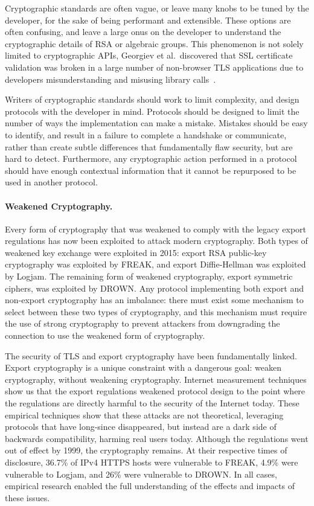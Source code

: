 Cryptographic standards are often vague, or leave many knobs to be tuned by
the developer, for the sake of being performant and extensible. These options
are often confusing, and leave a large onus on the developer to understand
the cryptographic details of RSA or algebraic groups. This phenomenon is not
solely limited to cryptographic APIs, Georgiev et al.\ discovered that SSL
certificate validation was broken in a large number of non-browser TLS
applications due to developers misunderstanding and misusing library
calls~\cite{most-dangerous-code-2012}.

Writers of cryptographic standards should work to limit complexity, and
design protocols with the developer in mind. Protocols should be designed to
limit the number of ways the implementation can make a mistake. Mistakes
should be easy to identify, and result in a failure to complete a handshake
or communicate, rather than create subtle differences that fundamentally flaw
security, but are hard to detect. Furthermore, any cryptographic action
performed in a protocol should have enough contextual information that it
cannot be repurposed to be used in another protocol.

\paragraph{Weakened Cryptography.}
Every form of cryptography that was weakened to comply with the legacy export
regulations has now been exploited to attack modern cryptography. Both types
of weakened key exchange were exploited in 2015: export RSA public-key
cryptography was exploited by FREAK, and export Diffie-Hellman was exploited
by Logjam. The remaining form of weakened cryptography, export symmetric
ciphers, was exploited by DROWN. Any protocol implementing both export and
non-export cryptography has an imbalance: there must exist some mechanism to
select between these two types of cryptography, and this mechanism must
require the use of strong cryptography to prevent attackers from downgrading
the connection to use the weakened form of cryptography.

The security of TLS and export cryptography have been fundamentally linked.
Export cryptography is a unique constraint with a dangerous goal: weaken
cryptography, without weakening cryptography. Internet measurement techniques
show us that the export regulations weakened protocol design to the point
where the regulations are directly harmful to the security of the Internet
today. These empirical techniques show that these attacks are not
theoretical, leveraging protocols that have long-since disappeared, but
instead are a dark side of backwards compatibility, harming real users today.
Although the regulations went out of effect by 1999, the cryptography
remains. At their respective times of disclosure, 36.7\% of IPv4 HTTPS hosts
were vulnerable to FREAK, 4.9\% were vulnerable to Logjam, and 26\% were
vulnerable to DROWN. In all cases, empirical research enabled the full
understanding of the effects and impacts of these issues.

